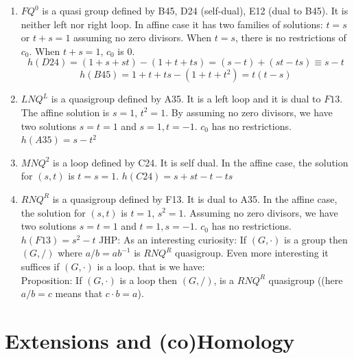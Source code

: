 \documentclass[11pt]{amsart}
\theoremstyle{definition}
\begin{document}
\begin{enumerate}
    \item[(23)] $FQ^0$ is a quasi group defined by B45, D24 (self-dual), E12 (dual to B45).  It is neither left nor right loop. In affine case it has two families of solutions:
     $t=s$ or $t+s=1$ assuming no zero divisors. When $t=s$, there is no restrictions of $c_0$. When $t+s=1$, $c_0$ is 0.
     $$h(D24)=(1+s+st)-(1+t+ts)=(s-t)+ (st-ts)\equiv s-t$$
     $$h(B45)= 1+t+ts -(1+t+t^2)= t(t-s)$$



     \item[(24)] $LNQ^L$ is a quasigroup defined by A35. It is a left loop and it is dual to $F13$. The affine solution is $s=1$, $t^2=1$. By assuming no zero divisors, we have two solutions $s=t=1$ and $s=1, t=-1$. $c_0$ has no restrictions.
     $h(A35) = s-t^2$
    

    
    \item[(25)] $MNQ^2$ is a loop defined by C24. It is self dual. In the affine case, the solution for $(s,t)$ is $t=s=1$.
    $h(C24) = s+st-t-ts$

    

    
    \item[(26)] $RNQ^R$ is a quasigroup defined by F13. It is  dual to A35. In the affine case, the solution for $(s,t)$ is $t=1$, $s^2=1$. Assuming no zero divisors, we have two solutions $s=t=1$ and $t=1, s = -1$. $c_0$ has no restrictions.
    $h(F13) = s^2-t$
    {\color{red}JHP: As an interesting curiosity: If $(G,\cdot)$ is a group then $(G,/ ) $ where $a/b=ab^{-1}$ is $RNQ^R$ quasigroup. Even more interesting it suffices if $(G,\cdot)$ is a loop. that is we have:\\
    Proposition: If $(G,\cdot)$ is a loop then $(G,/ )$, is a $RNQ^R$ quasigroup ((here $a/b=c$ means that $c\cdot b=a$).}

    

    
\end{enumerate}

\fi

 


\section{Extensions and (co)Homology}\label{S:EH}
\end{document}
